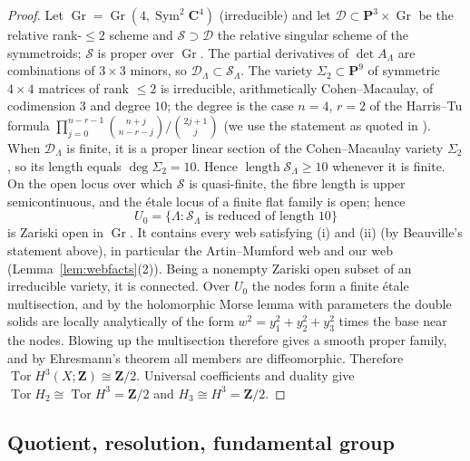 \documentclass[11pt]{amsart}
\numberwithin{equation}{section}
\theoremstyle{definition}
\theoremstyle{remark}
\newcommand{\Z}{\mathbf Z}
\newcommand{\C}{\mathbf C}
\newcommand{\PP}{\mathbf P}
\DeclareMathOperator{\Tor}{Tor}
\DeclareMathOperator{\Sym}{Sym}
\DeclareMathOperator{\Gr}{Gr}
\begin{document}
\begin{proof}
Let $\Gr=\Gr(4,\Sym^2\C^4)$ (irreducible) and let
$\mathcal D\subset\PP^3\times\Gr$ be the relative rank-$\le2$ scheme and
$\mathcal S\supset\mathcal D$ the relative singular scheme of the
symmetroids; $\mathcal S$ is proper over $\Gr$. The partial derivatives of
$\det A_\Lambda$ are combinations of $3\times3$ minors, so
$\mathcal D_\Lambda\subset\mathcal S_\Lambda$. The variety $\Sigma_2\subset
\PP^9$ of symmetric $4\times4$ matrices of rank $\le2$ is irreducible,
arithmetically Cohen--Macaulay, of codimension $3$ and degree $10$; the
degree is the case $n=4$, $r=2$ of the Harris--Tu formula
$\prod_{j=0}^{n-r-1}\binom{n+j}{n-r-j}/\binom{2j+1}{j}$
\cite{HarrisTu1984} (we use the statement as quoted in
\cite[\S1]{BHORS2012}). When $\mathcal D_\Lambda$ is finite, it is a proper
linear section of the Cohen--Macaulay variety $\Sigma_2$, so its length
equals $\deg\Sigma_2=10$. Hence $\operatorname{length}\mathcal S_\Lambda\ge10$
whenever it is finite. On the open locus over which $\mathcal S$ is
quasi-finite, the fibre length is upper semicontinuous, and the \'etale
locus of a finite flat family is open; hence
\[
  U_0=\{\Lambda:\mathcal S_\Lambda\text{ is reduced of length }10\}
\]
is Zariski open in $\Gr$. It contains every web satisfying (i) and (ii)
(by Beauville's statement above), in particular the Artin--Mumford web and
our web (Lemma~\ref{lem:webfacts}(2)). Being a nonempty Zariski open subset
of an irreducible variety, it is connected. Over $U_0$ the nodes form a
finite \'etale multisection, and by the holomorphic Morse lemma with
parameters the double solids are locally analytically of the form
$w^2=y_1^2+y_2^2+y_3^2$ times the base near the nodes. Blowing up the
multisection therefore gives a smooth proper family, and by Ehresmann's
theorem all members are diffeomorphic. Therefore
$\Tor H^3(X;\Z)\cong\Z/2$. Universal coefficients and duality give
$\Tor H_2\cong\Tor H^3=\Z/2$ and $H_3\cong H^3=\Z/2$.
\end{proof}

\subsection{Quotient, resolution, fundamental group}
\end{document}
